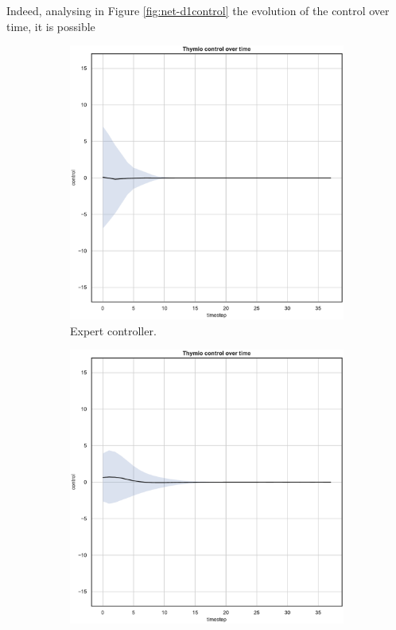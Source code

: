 Indeed, analysing in Figure \ref{fig:net-d1control} the evolution of the control 
over time, it is possible 
\begin{figure}[!htb]
	\centering
	\begin{subfigure}[h]{0.3\textwidth}
		\centering
		\includegraphics[width=\textwidth]{contents/images/net-d1/control-overtime-omniscient}%
		\caption{Expert controller.}
	\end{subfigure}
	\hfill
	\begin{subfigure}[h]{0.3\textwidth}
		\centering
		\includegraphics[width=\textwidth]{contents/images/net-d1/control-overtime-manual}%

\end{subfigure}
\end{figure}
